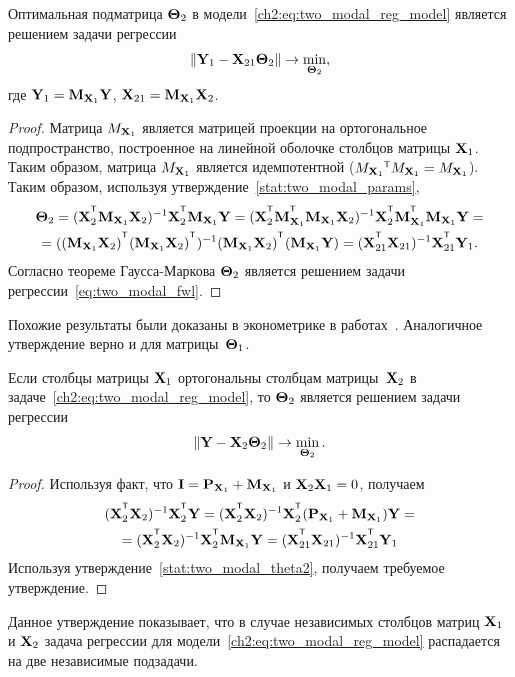 \begin{statement}
	\label{stat:two_modal_theta2}
	Оптимальная подматрица $\boldsymbol{\Theta}_2$ в модели~\eqref{ch2:eq:two_modal_reg_model} является решением задачи регрессии
	\begin{equation}
		\| \mathbf{Y}_1 -  \mathbf{X}_{21} \boldsymbol{\Theta}_2 \| \rightarrow \min_{\boldsymbol{\Theta}_2},
		\label{eq:two_modal_fwl}
	\end{equation}
	где $\mathbf{Y}_1 = \mathbf{M}_{\mathbf{X}_1} \mathbf{Y}$, $\mathbf{X}_{21} = \mathbf{M}_{\mathbf{X}_1} \mathbf{X}_2$.
\end{statement}

\begin{proof}
	Матрица $M_{\mathbf{X}_1}$ является матрицей проекции на ортогональное подпространство, построенное на линейной оболочке столбцов матрицы $\mathbf{X}_1$. Таким образом, матрица $M_{\mathbf{X}_1}$ является идемпотентной ($M_{\bX_1}{\T} M_{\bX_1} = M_{\bX_1}$). 
	Таким образом, используя утверждение~\autoref{stat:two_modal_params},
	\begin{multline*}
		\bTheta_2 = (\bX_2^{\T} \bM_{\bX_1} \bX_2)^{-1} \bX_2^{\T} \bM_{\bX_1} \bY = (\bX_2^{\T} \bM_{\bX_1}^{\T} \bM_{\bX_1} \bX_2)^{-1} \bX_2^{\T} \bM_{\bX_1}^{\T} \bM_{\bX_1} \bY = \\
		= ((\bM_{\bX_1} \bX_2)^{\T} (\bM_{\bX_1} \bX_2)^{\T})^{-1} (\bM_{\bX_1} \bX_2)^{\T} (\bM_{\bX_1} \bY) = (\bX_{21}^{\T} \bX_{21})^{-1} \bX_{21}^{\T} \bY_1.
	\end{multline*}
	Согласно теореме Гаусса-Маркова $\boldsymbol{\Theta}_2$ является решением задачи регрессии~\eqref{eq:two_modal_fwl}.
\end{proof}

Похожие результаты были доказаны в эконометрике в работах~\cite{frisch1933partial,lovell1963seasonal,cinelli2020making}. Аналогичное утверждение верно и для матрицы~$\boldsymbol{\Theta}_1$. 

\begin{statement}
	Если столбцы матрицы $\mathbf{X}_1$ ортогональны столбцам матрицы~$\mathbf{X}_2$ в задаче~\eqref{ch2:eq:two_modal_reg_model}, то $\boldsymbol{\Theta}_2$ является решением задачи регрессии
	\[
			\| \mathbf{Y} -  \mathbf{X}_{2} \boldsymbol{\Theta}_2 \| \rightarrow \min_{\boldsymbol{\Theta}_2}.
	\]
\end{statement}

\begin{proof}
	Используя факт, что $\mathbf{I} = \mathbf{P}_{\mathbf{X}_1} + \mathbf{M}_{\mathbf{X}_1}$ и $\mathbf{X}_2 \mathbf{X}_1 = 0$, получаем
	\begin{multline*}
		(\bX_2^{\T} \bX_2)^{-1} \bX_2^{\T} \bY = (\bX_2^{\T} \bX_2)^{-1} \bX_2^{\T} (\bP_{\bX_1} + \bM_{\bX_1}) \bY = \\ = (\bX_2^{\T} \bX_2)^{-1} \bX_2^{\T} \bM_{\bX_1} \bY  = (\bX_{21}^{\T} \bX_{21})^{-1} \bX_{21}^{\T} \bY_1
	\end{multline*}
	Используя утверждение~\autoref{stat:two_modal_theta2}, получаем требуемое утверждение.
\end{proof}
Данное утверждение показывает, что в случае независимых столбцов матриц $\mathbf{X}_1$ и $\mathbf{X}_2$ задача регрессии для модели~\eqref{ch2:eq:two_modal_reg_model} распадается на две независимые подзадачи.

